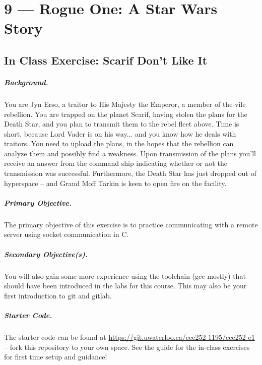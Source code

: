 \documentclass[a4paper]{report}
\newcommand{\termnumeric}{1195}
\begin{document}
\chapter*{9 --- Rogue One: A Star Wars Story}


\section*{In Class Exercise: Scarif Don't Like It}

\paragraph{Background.}
You are Jyn Erso, a traitor to His Majesty the Emperor, a member of the vile rebellion. You are trapped on the planet Scarif, having stolen the plans for the Death Star, and you plan to transmit them to the rebel fleet above. Time is short, because Lord Vader is on his way... and you know how he deals with traitors. You need to upload the plans, in the hopes that the rebellion can analyze them and possibly find a weakness. Upon transmission of the plans you'll receive an answer from the command ship indicating whether or not the transmission was successful. Furthermore, the Death Star has just dropped out of hyperspace -- and Grand Moff Tarkin is keen to open fire on the facility.

\paragraph{Primary Objective.} The primary objective of this exercise is to practice communicating with a remote server using socket communication in C.

\paragraph{Secondary Objective(s).} You will also gain some more experience using the toolchain (gcc mostly) that should have been introduced in the labs for this course. This may also be your first introduction to git and gitlab.

\paragraph{Starter Code.} The starter code can be found at \url{https://git.uwaterloo.ca/ece252-\termnumeric/ece252-e1} -- fork this repository to your own space. See the guide for the in-class exercises for first time setup and guidance!
\end{document}
